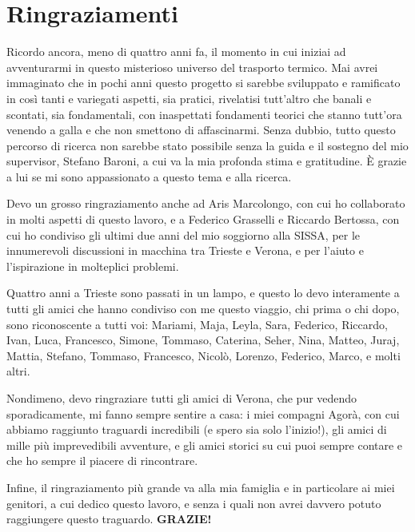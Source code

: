 \chapter*{Ringraziamenti}

Ricordo ancora, meno di quattro anni fa, il momento in cui iniziai ad avventurarmi in questo misterioso universo del trasporto termico. Mai avrei immaginato che in pochi anni questo progetto si sarebbe sviluppato e ramificato in così tanti e variegati aspetti, sia pratici, rivelatisi tutt'altro che banali e scontati, sia fondamentali, con inaspettati fondamenti teorici che stanno tutt'ora venendo a galla e che non smettono di affascinarmi. 
Senza dubbio, tutto questo percorso di ricerca non sarebbe stato possibile senza la guida e il sostegno del mio supervisor, Stefano Baroni, a cui va la mia profonda stima e gratitudine. È grazie a lui se mi sono appassionato a questo tema e alla ricerca. 

Devo un grosso ringraziamento anche ad Aris Marcolongo, con cui ho collaborato in molti aspetti di questo lavoro, e a Federico Grasselli e Riccardo Bertossa, con cui ho condiviso gli ultimi due anni del mio soggiorno alla SISSA, per le innumerevoli discussioni in macchina tra Trieste e Verona, e per l'aiuto e l'ispirazione in molteplici problemi.

Quattro anni a Trieste sono passati in un lampo, e questo lo devo interamente a tutti gli amici che hanno condiviso con me questo viaggio, chi prima o chi dopo, sono riconoscente a tutti voi: 
Mariami, Maja, Leyla, Sara, Federico, Riccardo, Ivan, Luca, Francesco, Simone, Tommaso, Caterina, Seher, Nina, Matteo, Juraj, Mattia, Stefano, Tommaso, Francesco, Nicolò, Lorenzo, Federico, Marco, e molti altri.

Nondimeno, devo ringraziare tutti gli amici di Verona, che pur vedendo sporadicamente, mi fanno sempre sentire a casa: i miei compagni Agorà, con cui abbiamo raggiunto traguardi incredibili (e spero sia solo l'inizio!), gli amici di mille più imprevedibili avventure, e gli amici storici su cui puoi sempre contare e che ho sempre il piacere di rincontrare. 

Infine, il ringraziamento più grande va alla mia famiglia e in particolare ai miei genitori, a cui dedico questo lavoro, e senza i quali non avrei davvero potuto raggiungere questo traguardo. \textbf{GRAZIE!}
